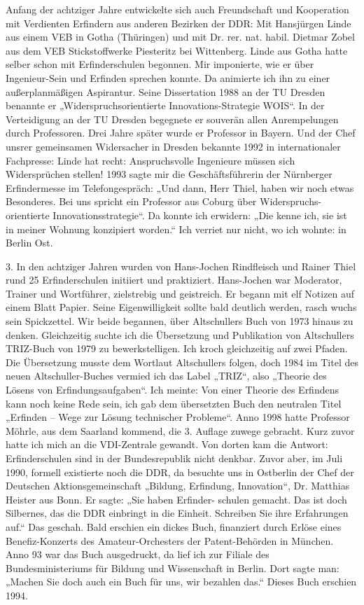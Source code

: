 \documentclass[12pt,a4paper]{article}
\begin{document}
Anfang der achtziger Jahre entwickelte sich auch Freundschaft und Kooperation
mit Verdienten Erfindern aus anderen Bezirken der DDR: Mit Hansjürgen Linde
aus einem VEB in Gotha (Thüringen) und mit Dr. rer. nat. habil. Dietmar Zobel
aus dem VEB Stickstoffwerke Piesteritz bei Wittenberg. Linde aus Gotha hatte
selber schon mit Erfinderschulen begonnen. Mir imponierte, wie er über
Ingenieur-Sein und Erfinden sprechen konnte. Da animierte ich ihn zu einer
außerplanmäßigen Aspirantur. Seine Dissertation 1988 an der TU Dresden
benannte er „Widerspruchsorientierte Innovations-Strategie WOIS“. In der
Verteidigung an der TU Dresden begegnete er souverän allen Anrempelungen durch
Professoren. Drei Jahre später wurde er Professor in Bayern. Und der Chef
unsrer gemeinsamen Widersacher in Dresden bekannte 1992 in internationaler
Fachpresse: Linde hat recht: Anspruchsvolle Ingenieure müssen sich
Widersprüchen stellen! 1993 sagte mir die Geschäftsführerin der Nürnberger
Erfindermesse im Telefongespräch: „Und dann, Herr Thiel, haben wir noch etwas
Besonderes. Bei uns spricht ein Professor aus Coburg über Widerspruchs-
orientierte Innovationsstrategie“. Da konnte ich erwidern: „Die kenne ich, sie
ist in meiner Wohnung konzipiert worden.“ Ich verriet nur nicht, wo ich
wohnte: in Berlin Ost.

3. In den achtziger Jahren wurden von Hans-Jochen Rindfleisch und Rainer Thiel
rund 25 Erfinderschulen initiiert und praktiziert. Hans-Jochen war Moderator,
Trainer und Wortführer, zielstrebig und geistreich. Er begann mit elf Notizen
auf einem Blatt Papier. Seine Eigenwilligkeit sollte bald deutlich werden,
rasch wuchs sein Spickzettel. Wir beide begannen, über Altschullers Buch von
1973 hinaus zu denken. Gleichzeitig suchte ich die Übersetzung und Publikation
von Altschullers TRIZ-Buch von 1979 zu bewerkstelligen. Ich kroch gleichzeitig
auf zwei Pfaden. Die Übersetzung musste dem Wortlaut Altschullers folgen, doch
1984 im Titel des neuen Altschuller-Buches vermied ich das Label „TRIZ“, also
„Theorie des Lösens von Erfindungsaufgaben“. Ich meinte: Von einer Theorie des
Erfindens kann noch keine Rede sein, ich gab dem übersetzten Buch den
neutralen Titel „Erfinden – Wege zur Lösung technischer Probleme“. Anno 1998
hatte Professor Möhrle, aus dem Saarland kommend, die 3. Auflage zuwege
gebracht. Kurz zuvor hatte ich mich an die VDI-Zentrale gewandt. Von dorten
kam die Antwort: Erfinderschulen sind in der Bundesrepublik nicht denkbar.
Zuvor aber, im Juli 1990, formell existierte noch die DDR, da besuchte uns in
Ostberlin der Chef der Deutschen Aktionsgemeinschaft „Bildung, Erfindung,
Innovation“, Dr. Matthias Heister aus Bonn. Er sagte: „Sie haben Erfinder-
schulen gemacht. Das ist doch Silbernes, das die DDR einbringt in die Einheit.
Schreiben Sie ihre Erfahrungen auf.“ Das geschah. Bald erschien ein dickes
Buch, finanziert durch Erlöse eines Benefiz-Konzerts des Amateur-Orchesters
der Patent-Behörden in München. Anno 93 war das Buch ausgedruckt, da lief ich
zur Filiale des Bundesministeriums für Bildung und Wissenschaft in Berlin.
Dort sagte man: „Machen Sie doch auch ein Buch für uns, wir bezahlen das.“
Dieses Buch erschien 1994.
\end{document}
